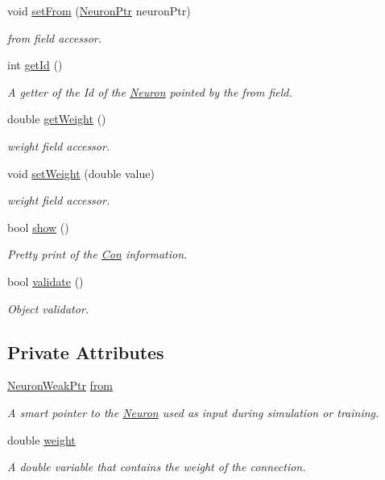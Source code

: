 \begin{DoxyCompactItemize}
void \hyperlink{class_con_a927378392a3ee1fe958b1670cb72e61d}{setFrom} (\hyperlink{_a_m_o_r_e_8h_ac1ea936c2c7728eb382278131652fef4}{NeuronPtr} neuronPtr)
\begin{DoxyCompactList}\small\item\em from field accessor. \end{DoxyCompactList}\item 
int \hyperlink{class_con_ad12ce81a557eadb2a00b10d5b5f4adb6}{getId} ()
\begin{DoxyCompactList}\small\item\em A getter of the Id of the \hyperlink{class_neuron}{Neuron} pointed by the from field. \end{DoxyCompactList}\item 
double \hyperlink{class_con_a385c5bf6eb9e2ffc94c5b427c287ccb2}{getWeight} ()
\begin{DoxyCompactList}\small\item\em weight field accessor. \end{DoxyCompactList}\item 
void \hyperlink{class_con_ad5c1a25a2ded72999bf5293f5e55d7d9}{setWeight} (double value)
\begin{DoxyCompactList}\small\item\em weight field accessor. \end{DoxyCompactList}\item 
bool \hyperlink{class_con_ab85838575b5e01f3b8073136f2102922}{show} ()
\begin{DoxyCompactList}\small\item\em Pretty print of the \hyperlink{class_con}{Con} information. \end{DoxyCompactList}\item 
bool \hyperlink{class_con_af5f836a7b0988b3d9113589b2959d5e6}{validate} ()
\begin{DoxyCompactList}\small\item\em Object validator. \end{DoxyCompactList}\end{DoxyCompactItemize}
\subsection*{Private Attributes}
\begin{DoxyCompactItemize}
\item 
\hyperlink{_a_m_o_r_e_8h_a3e2d414e247d33f77957e70765d161c0}{NeuronWeakPtr} \hyperlink{class_con_a7c05f90dff56fd26c1fa0f042bba67a6}{from}
\begin{DoxyCompactList}\small\item\em A smart pointer to the \hyperlink{class_neuron}{Neuron} used as input during simulation or training. \end{DoxyCompactList}\item 
double \hyperlink{class_con_a7f46485ba5b41971ea38641f9e7d1be0}{weight}
\begin{DoxyCompactList}\small\item\em A double variable that contains the weight of the connection. \end{DoxyCompactList}\end{DoxyCompactItemize}


